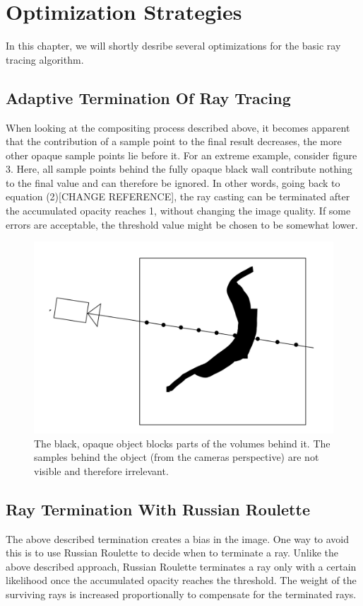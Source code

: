 \section{Optimization Strategies}
In this chapter, we will shortly desribe several optimizations for the basic ray tracing algorithm.
\subsection{Adaptive Termination Of Ray Tracing}
When looking at the compositing process described above, it becomes apparent that the contribution of a sample point to the final result decreases, the more other opaque sample points lie before it\cite{10.1145/78964.78965}. For an extreme example, consider figure 3. Here, all sample points behind the fully opaque black wall contribute nothing to the final value and can therefore be ignored. In other words, going back to equation (2)[CHANGE REFERENCE], the ray casting can be terminated after the accumulated opacity reaches 1, without changing the image quality. If some errors are acceptable, the threshold value might be chosen to be somewhat lower.
 \begin{figure}[htb]
  \centering
  \includegraphics[width=.8\linewidth]{wall.png}
  \parbox[t]{.9\columnwidth}{\relax}
  \caption{\label{fig:img2}
         The black, opaque object blocks parts of the volumes behind it. The samples behind the object (from the cameras perspective) are not visible and therefore irrelevant. }
\end{figure}
\subsection{Ray Termination With Russian Roulette}
The above described termination creates a bias in the image\cite{10.1145/97880.97886}. One way to avoid this is to use Russian Roulette to decide when to terminate a ray\cite{10.1145/147130.147155}. Unlike the above described approach, Russian Roulette terminates a ray only with a certain likelihood once the accumulated opacity reaches the threshold. The weight of the surviving rays is increased proportionally to compensate for the terminated rays.

